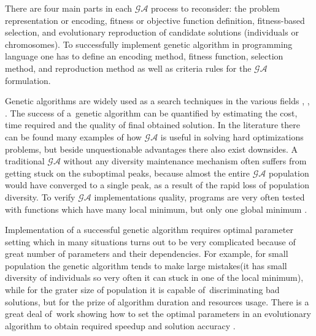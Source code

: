   There are four main parts in each $\mathcal{GA}$ process to reconsider: the problem representation or encoding, 
fitness or objective function definition, fitness-based selection, and evolutionary reproduction of 
candidate solutions (individuals or chromosomes). To successfully implement
genetic algorithm in programming language one has to define an encoding method,
fitness function, selection method, and reproduction method as well as criteria rules 
for the $\mathcal{GA}$ formulation. 


Genetic algorithms are widely used as a search techniques in the various fields \cite{bib6}, \cite{bib14},
\cite{bib16}. The success of a~genetic
 algorithm can be quantified by estimating the cost, time required 
 and the quality of final obtained solution. In the literature there can 
 be found many examples of how $\mathcal{GA}$ is useful in solving hard optimizations problems, 
 but beside unquestionable advantages there also exist downsides. A traditional
 $\mathcal{GA}$ without any diversity maintenance mechanism often suffers from
 getting stuck on the suboptimal peaks, because 
 almost the entire $\mathcal{GA}$ population would have converged to a single peak, as a result 
 of the rapid loss of population diversity. To verify $\mathcal{GA}$
 implementations quality, programs are very often tested with functions which
 have many local minimum, but only one global minimum \cite{bib25}.
 
 Implementation of a successful genetic algorithm requires optimal parameter setting
 which in many situations turns out to be very complicated because of great
 number of parameters and their dependencies. For example, for small population
 the genetic algorithm tends to make large mistakes(it has small diversity of
 individuals so very often it can stuck in one of the local minimum), while for the grater size
 of population it is capable of~discriminating bad solutions, but for the prize
 of algorithm duration and resources usage. There is a great deal of~work showing how to set
 the optimal parameters in an evolutionary algorithm to obtain required speedup
 and solution accuracy \cite{bib1}.

